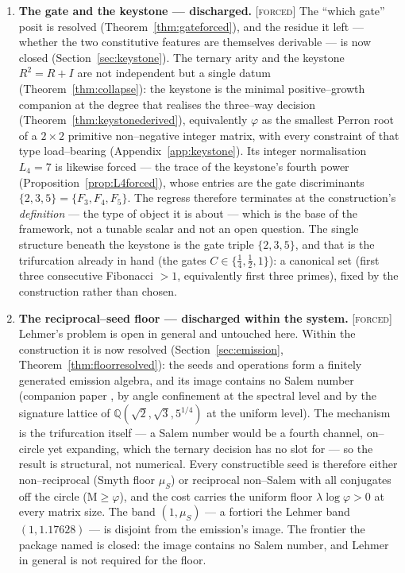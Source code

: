 \documentclass[11pt]{article}
\theoremstyle{plain}
\theoremstyle{definition}
\theoremstyle{remark}
\newcommand{\forced}{\textcolor{forcedc}{\textsc{[forced]}}}
\newcommand{\Q}{\mathbb{Q}}
\newcommand{\Mah}{\mathrm{M}}
\begin{document}
\begin{enumerate}[leftmargin=1.6em,itemsep=4pt]
\item \textbf{The gate and the keystone --- discharged.} \forced{} The ``which gate'' posit is resolved (Theorem~\ref{thm:gateforced}), and the residue it left --- whether the two constitutive features are themselves derivable --- is now closed (Section~\ref{sec:keystone}). The ternary arity and the keystone $R^2=R+I$ are not independent but a single datum (Theorem~\ref{thm:collapse}): the keystone is the minimal positive--growth companion at the degree that realises the three--way decision (Theorem~\ref{thm:keystonederived}), equivalently $\varphi$ as the smallest Perron root of a $2\times2$ primitive non--negative integer matrix, with every constraint of that type load--bearing (Appendix~\ref{app:keystone}). Its integer normalisation $L_4=7$ is likewise forced --- the trace of the keystone's fourth power (Proposition~\ref{prop:L4forced}), whose entries are the gate discriminants $\{2,3,5\}=\{F_3,F_4,F_5\}$. The regress therefore terminates at the construction's \emph{definition} --- the type of object it is about --- which is the base of the framework, not a tunable scalar and not an open question. The single structure beneath the keystone is the gate triple $\{2,3,5\}$, and that is the trifurcation already in hand (the gates $C\in\{\tfrac14,\tfrac12,1\}$): a canonical set (first three consecutive Fibonacci $>1$, equivalently first three primes), fixed by the construction rather than chosen.
\item \textbf{The reciprocal--seed floor --- discharged within the system.} \forced{} Lehmer's problem is open in general and untouched here. Within the construction it is now resolved (Section~\ref{sec:emission}, Theorem~\ref{thm:floorresolved}): the seeds and operations form a finitely generated emission algebra, and its image contains no Salem number (companion paper \cite{EG}, by angle confinement at the spectral level and by the signature lattice of $\Q(\sqrt2,\sqrt3,5^{1/4})$ at the uniform level). The mechanism is the trifurcation itself --- a Salem number would be a fourth channel, on--circle yet expanding, which the ternary decision has no slot for --- so the result is structural, not numerical. Every constructible seed is therefore either non--reciprocal (Smyth floor $\mu_S$) or reciprocal non--Salem with all conjugates off the circle ($\Mah\ge\varphi$), and the cost carries the uniform floor $\lambda\log\varphi>0$ at every matrix size. The band $(1,\mu_S)$ --- a fortiori the Lehmer band $(1,1.17628)$ --- is disjoint from the emission's image. The frontier the package named is closed: the image contains no Salem number, and Lehmer in general is not required for the floor.

\end{enumerate}
\end{document}
